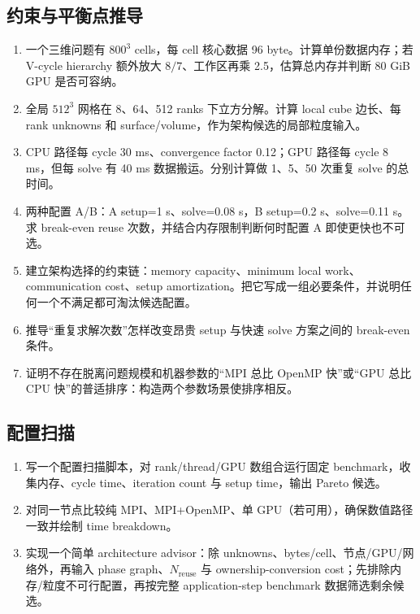 \subsection*{约束与平衡点推导}
\begin{enumerate}[label=\arabic*.]
\item 一个三维问题有 $800^3$ cells，每 cell 核心数据 96 byte。计算单份数据内存；若 V-cycle hierarchy 额外放大 $8/7$、工作区再乘 2.5，估算总内存并判断 80 GiB GPU 是否可容纳。
\item 全局 $512^3$ 网格在 8、64、512 ranks 下立方分解。计算 local cube 边长、每 rank unknowns 和 surface/volume，作为架构候选的局部粒度输入。
\item CPU 路径每 cycle 30 ms、convergence factor 0.12；GPU 路径每 cycle 8 ms，但每 solve 有 40 ms 数据搬运。分别计算做 1、5、50 次重复 solve 的总时间。
\item 两种配置 A/B：A setup=1 s、solve=0.08 s，B setup=0.2 s、solve=0.11 s。求 break-even reuse 次数，并结合内存限制判断何时配置 A 即使更快也不可选。

\item 建立架构选择的约束链：memory capacity、minimum local work、communication cost、setup amortization。把它写成一组必要条件，并说明任何一个不满足都可淘汰候选配置。
\item 推导“重复求解次数”怎样改变昂贵 setup 与快速 solve 方案之间的 break-even 条件。
\item 证明不存在脱离问题规模和机器参数的“MPI 总比 OpenMP 快”或“GPU 总比 CPU 快”的普适排序：构造两个参数场景使排序相反。
\end{enumerate}

\subsection*{配置扫描}
\begin{enumerate}[label=\arabic*.]
\item 写一个配置扫描脚本，对 rank/thread/GPU 数组合运行固定 benchmark，收集内存、cycle time、iteration count 与 setup time，输出 Pareto 候选。
\item 对同一节点比较纯 MPI、MPI+OpenMP、单 GPU（若可用），确保数值路径一致并绘制 time breakdown。
\item 实现一个简单 architecture advisor：除 unknowns、bytes/cell、节点/GPU/网络外，再输入 phase graph、$N_{\mathrm{reuse}}$ 与 ownership-conversion cost；先排除内存/粒度不可行配置，再按完整 application-step benchmark 数据筛选剩余候选。
\end{enumerate}

